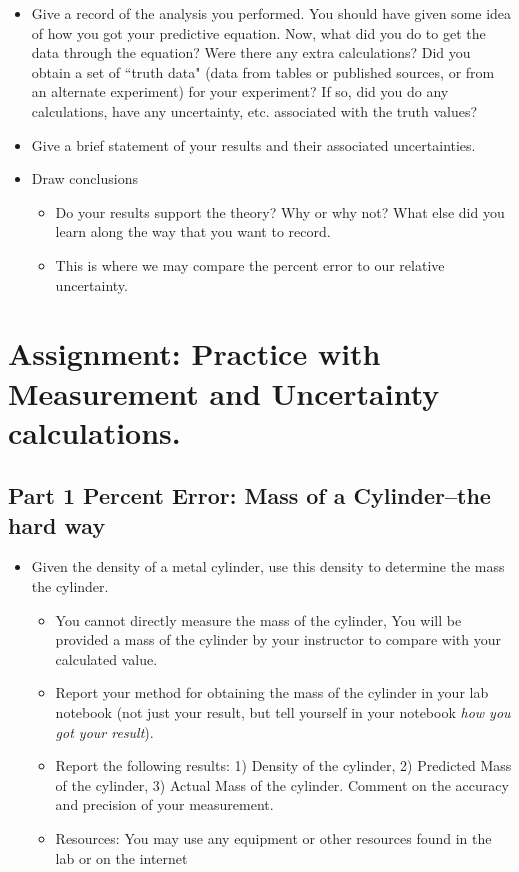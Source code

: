 \documentclass[twoside,11pt,ShortChapTitles]{BYUTextbook}
\begin{document}
\begin{itemize}
\item Give a record of the analysis you performed. You should have given some
idea of how you got your predictive equation. Now, what did you do to get the
data through the equation? Were there any extra calculations? Did you obtain a
set of  ``truth data" (data from tables or
published sources, or from an alternate experiment) for your experiment? If
so, did you do any calculations, have any uncertainty, etc. associated with
the truth values?

\item Give a brief statement of your results and their associated uncertainties.

\item Draw conclusions

\begin{itemize}
\item Do your results support the theory? Why or why not? What else did you
learn along the way that you want to record.

\item This is where we may compare the percent error to our relative uncertainty.
\end{itemize}
\end{itemize}



\section{Assignment: Practice with Measurement and Uncertainty calculations.}

\subsection{Part 1 Percent Error: Mass of a Cylinder--the hard way}

\begin{itemize}
\item Given the density of a metal cylinder, use this density to determine the
mass the cylinder.

\begin{itemize}
\item You cannot directly measure the mass of the cylinder, You will be
provided a mass of the cylinder by your instructor to compare with your
calculated value.

\item Report your method for obtaining the mass of the cylinder in your lab
notebook (not just your result, but tell yourself in your notebook \emph{how
you got your result}).

\item Report the following results: 1) Density of the cylinder, 2) Predicted
Mass of the cylinder, 3) Actual Mass of the cylinder. Comment on the accuracy
and precision of your measurement.

\item Resources: You may use any equipment or other resources found in the lab
or on the internet
\end{itemize}
\end{itemize}
\end{document}
